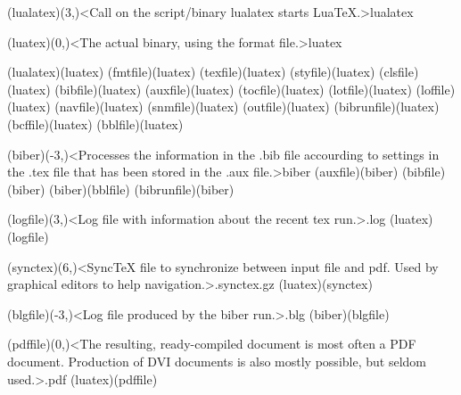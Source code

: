 {	\steplayer

	\tonode[\program](lualatex)(3,\layer)<Call on the script/binary lualatex starts LuaTeX.>{lualatex}

	\tonode[\program](luatex)(0,\layer)<The actual binary, using the format file.>{luatex}

	\todraw[->](lualatex)(luatex)
	\todraw[->](fmtfile)(luatex)
	\todraw[->](texfile)(luatex)
	\todraw[->](styfile)(luatex)
	\todraw[->](clsfile)(luatex)
	\todraw[->](bibfile)(luatex)
	\todraw[<->](auxfile)(luatex)
	\todraw[<->](tocfile)(luatex)
	\todraw[<->](lotfile)(luatex)
	\todraw[<->](loffile)(luatex)
	\todraw[<->](navfile)(luatex)
	\todraw[<->](snmfile)(luatex)
	\todraw[<->](outfile)(luatex)
	\todraw[<->](bibrunfile)(luatex)
	\todraw[<->](bcffile)(luatex)
	\todraw[->](bblfile)(luatex)



	\tonode[\program](biber)(-3,\layer)<Processes the information in the .bib file accourding to settings in the .tex file that has been stored in the .aux file.>{biber}
	\todraw[->](auxfile)(biber)
	\todraw[->](bibfile)(biber)
	\todraw[->](biber)(bblfile)
	\todraw[<->](bibrunfile)(biber)

	\steplayer[-3]

	\tonode[\automatic](logfile)(3,\layer)<Log file with information about the recent tex run.>{.log}
	\todraw[->](luatex)(logfile)

	\tonode[\automatic](synctex)(6,\layer)<SyncTeX file to synchronize between input file and pdf. Used by graphical editors to help navigation.>{.synctex.gz}
	\todraw[->](luatex)(synctex)

	\tonode[\additional](blgfile)(-3,\layer)<Log file produced by the biber run.>{.blg}
	\todraw[->](biber)(blgfile)

	\steplayer

	\tonode[\automatic](pdffile)(0,\layer)<The resulting, ready-compiled document is most often a PDF document. Production of DVI documents is also mostly possible, but seldom used.>{.pdf}
	\todraw[->](luatex)(pdffile)

}

\clearpage
{}
\label{sec:text}

\large
{}

\settextviews  %
\onecolumn

